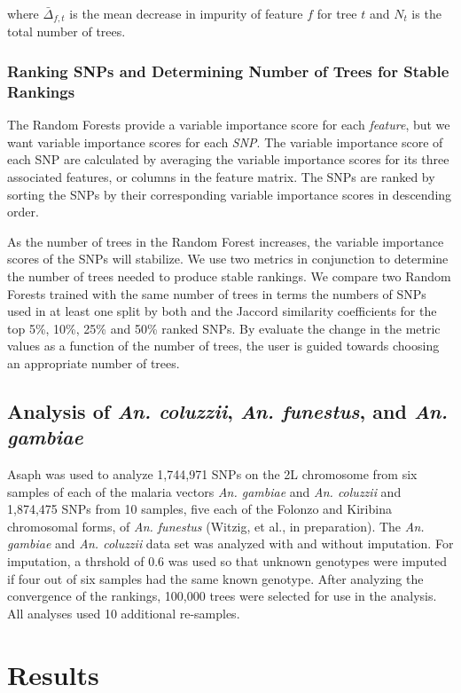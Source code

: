 where $\bar{\Delta}_{f, t}$ is the mean decrease in impurity of feature $f$ for tree $t$ and $N_t$ is the total number of trees.

\subsubsection{Ranking SNPs and Determining Number of Trees for Stable Rankings}
The Random Forests provide a variable importance score for each \emph{feature}, but we want variable importance scores for each \emph{SNP}. The variable importance score of each SNP are calculated by averaging the variable importance scores for its three associated features, or columns in the feature matrix.  The SNPs are ranked by sorting the SNPs by their corresponding variable importance scores in descending order.  

As the number of trees in the Random Forest increases, the variable importance scores of the SNPs will stabilize.  We use two metrics in conjunction to determine the number of trees needed to produce stable rankings. We compare two Random Forests trained with the same number of trees in terms the numbers of SNPs used in at least one split by both and the Jaccord similarity coefficients for the top 5\%, 10\%, 25\% and 50\% ranked SNPs.  By evaluate the change in the metric values as a function of the number of trees, the user is guided towards choosing an appropriate number of trees.

\subsection{Analysis of \emph{An. coluzzii}, \emph{An. funestus}, and \emph{An. gambiae}}
Asaph was used to analyze 1,744,971 SNPs on the 2L chromosome from six samples of each of the malaria vectors \emph{An. gambiae} and \emph{An. coluzzii} \cite{Fontaine2015} and 1,874,475 SNPs from 10 samples, five each of the Folonzo and Kiribina chromosomal forms, of \emph{An. funestus} (Witzig, et al., in preparation). The \emph{An. gambiae} and \emph{An. coluzzii} data set was analyzed with and without imputation. For imputation, a thrshold of 0.6 was used so that unknown genotypes were imputed if four out of six samples had the same known genotype.  After analyzing the convergence of the rankings, 100,000 trees were selected for use in the analysis.  All analyses used 10 additional re-samples.

\section{Results}


